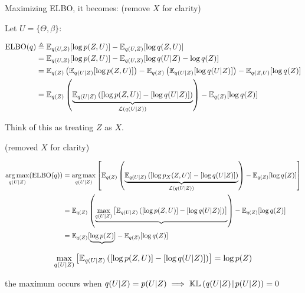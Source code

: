 \documentclass{article}
\begin{document}
Maximizing ELBO, it becomes: (remove $X$ for clarity)


Let $U = \{ \Theta, \beta \}$:

\begin{equation}
\begin{split}
	\text{ELBO}(q) &\triangleq \mathbb{E}_{q( U, Z) } [\log p (Z, U )] - \mathbb{E}_{q( U, Z)} [\log q(Z, U)]\\
	&= \mathbb{E}_{q( U, Z) } [\log p (Z, U )] - \mathbb{E}_{q( U, Z)} [\log q(U | Z) - \log q(Z) ]\\
	&= \mathbb{E}_{q (Z)} \left(  \mathbb{E}_{ q( U | Z) } [\log p (Z, U )]  \right) - \mathbb{E}_{q (Z)} \left(  \mathbb{E}_{ q( U | Z) }  [\log q( U | Z)] \right) -  \mathbb{E}_{q(Z, U)} [\log q(Z)] \\
	&= \mathbb{E}_{q (Z)} \left(  \underbrace{ \mathbb{E}_{ q( U | Z) } \left( [\log p (Z, U )] -  [\log q( U | Z)] \right)}_{\mathcal{L}(q( U | Z)) }  \right)-  \mathbb{E}_{q(Z)} [\log q(Z)] \\
\end{split}
\end{equation}

Think of this as treating $Z$ as $X$.


 

(removed $X$ for clarity)


\begin{equation}\begin{split}
	\operatorname*{arg\,max}_{q( U | Z) } ( \text{ELBO}(q) )
	&=  \operatorname*{arg\,max}_{q( U | Z) } \left[ \mathbb{E}_{q (Z)} \left(  \underbrace{ \mathbb{E}_{ q( U | Z) } \left( [\log p_X (Z, U )] -  [\log q( U | Z)] \right)}_{\mathcal{L}(q( U | Z)) }  \right)-  \mathbb{E}_{q(Z)} [\log q(Z)] \right] \\
		&= \mathbb{E}_{q (Z)} \left(  \underbrace{ \max_{q( U | Z) } \left[  \mathbb{E}_{ q( U | Z) } \left( [\log p (Z, U )] -  [\log q( U | Z)] \right) \right]}_{ }  \right) -  \mathbb{E}_{q(Z)} [\log q(Z)] \\
		&= \mathbb{E}_{q (Z)} [  \underbrace{\log p(Z)} ]-  \mathbb{E}_{q(Z)} [\log q(Z)]  \\
\end{split}\end{equation}

\begin{equation}\begin{split}
 \max_{q( U | Z) } \left[  \mathbb{E}_{ q( U | Z) } \left( [\log p (Z, U )] -  [\log q( U | Z)] \right) \right] = \log p(Z)
\end{split}\end{equation}


the maximum occurs when $q ( U | Z ) = p( U | Z) \implies \mathbb{KL}  \left( q( U | Z)  \| p(U | Z) \right) = 0$





\end{document}
